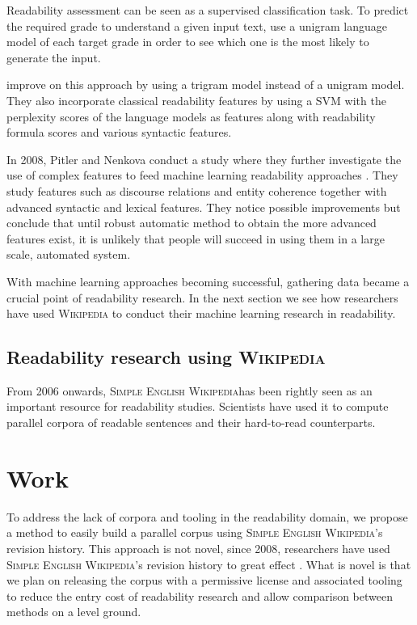 \documentclass[a4paper, 11pt, onepage]{scrreprt}
\newcommand\wiki{\textsc{Wikipedia}}
\newcommand\sew{\textsc{Simple English Wikipedia}}
\begin{document}
Readability assessment can be seen as a supervised classification
task. To predict the required grade to understand a given input text,
\cite{collins2004language} use a unigram language model of each target
grade in order to see which one is the most likely to generate the
input.

\cite{schwarm2005reading} improve on this approach by using a trigram
model instead of a unigram model. They also incorporate classical
readability features by using a SVM with the perplexity scores of the
language models as features along with readability formula scores and
various syntactic features.

In 2008, Pitler and Nenkova conduct a study where they further
investigate the use of complex features to feed machine learning
readability approaches \cite{pitler2008revisiting}. They study
features such as discourse relations and entity coherence together
with advanced syntactic and lexical features. They notice possible
improvements but conclude that until robust automatic method to obtain
the more advanced features exist, it is unlikely that people will
succeed in using them in a large scale, automated system.

With machine learning approaches becoming successful, gathering data
became a crucial point of readability research. In the next section we
see how researchers have used \wiki{} to conduct their machine
learning research in readability.

\section{Readability research using \wiki}
\label{sec:wiki-approaches}

From 2006 onwards, \sew has been rightly seen as an important resource
for readability studies. Scientists have used it to compute parallel
corpora of readable sentences and their hard-to-read counterparts.

\chapter{Work}
\label{cha:work}

To address the lack of corpora and tooling in the readability domain,
we propose a method to easily build a parallel corpus using \sew's
revision history. This approach is not novel, since 2008, researchers
have used \sew's revision history to great effect
\cite{nelken2008mining}. What is novel is that we plan on releasing
the corpus with a permissive license and associated tooling to reduce
the entry cost of readability research and allow comparison between
methods on a level ground.
\end{document}
